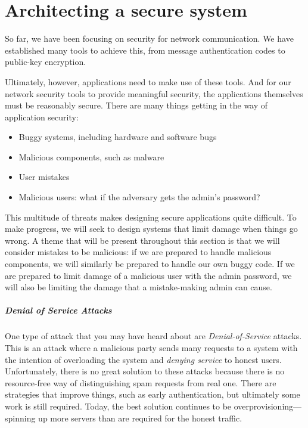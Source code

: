 \chapter{Architecting a secure system}

So far, we have been focusing on security for network communication. We have established many tools to achieve this, from message authentication codes to public-key encryption.

Ultimately, however, applications need to make use of these tools. And for our network security tools to provide meaningful security, the applications themselves must be reasonably secure. There are many things getting in the way of application security:
\begin{itemize}
	\item Buggy systems, including hardware and software bugs
	\item Malicious components, such as malware
	\item User mistakes
	\item Malicious users: what if the adversary gets the admin's password?
\end{itemize}
This multitude of threats makes designing secure applications quite difficult. To make progress, we will seek to design systems that limit damage when things go wrong. A theme that will be present throughout this section is that we will consider mistakes to be malicious: if we are prepared to handle malicious components, we will similarly be prepared to handle our own buggy code. If we are prepared to limit damage of a malicious user with the admin password, we will also be limiting the damage that a mistake-making admin can cause.

\paragraph{Denial of Service Attacks}
One type of attack that you may have heard about are \emph{Denial-of-Service} attacks. This is an attack where a malicious party sends many requests to a system with the intention of overloading the system and \emph{denying service} to honest users. Unfortunately, there is no great solution to these attacks because there is no resource-free way of distinguishing spam requests from real one. There are strategies that improve things, such as early authentication, but ultimately some work is still required. Today, the best solution continues to be overprovisioning---spinning up more servers than are required for the honest traffic.

